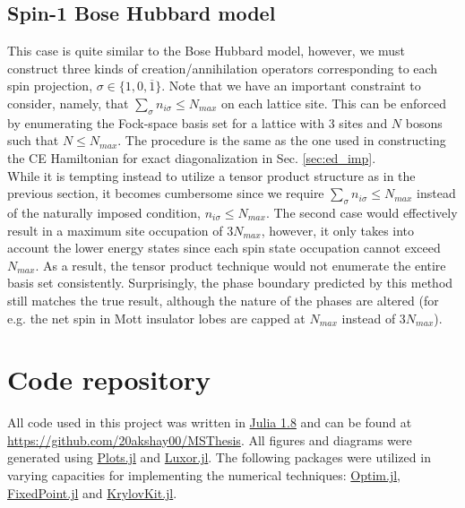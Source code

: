 \subsection{Spin-1 Bose Hubbard model}
This case is quite similar to the Bose Hubbard model, however, we must construct three kinds of creation/annihilation operators corresponding to each spin projection, $\sigma \in \{1, 0, \overline{1}\}$. Note that we have an important constraint to consider, namely, that $\sum_{\sigma} n_{i\sigma} \leq N_{max}$ on each lattice site. This can be enforced by enumerating the Fock-space basis set for a lattice with 3 sites and $N$ bosons such that $N \leq N_{max}$. The procedure is the same as the one used in constructing the CE Hamiltonian for exact diagonalization in Sec. \ref{sec:ed_imp}.
\vspace{0.5cm}\\
While it is tempting instead to utilize a tensor product structure as in the previous section, it becomes cumbersome since we require $\sum_{\sigma} n_{i\sigma} \leq N_{max}$ instead of the naturally imposed condition, $n_{i\sigma} \leq N_{max}$. The second case would effectively result in a maximum site occupation of $3N_{max}$, however, it only takes into account the lower energy states since each spin state occupation cannot exceed $N_{max}$. As a result, the tensor product technique would not enumerate the entire basis set consistently. Surprisingly, the phase boundary predicted by this method still matches the true result, although the nature of the phases are altered (for e.g. the net spin in Mott insulator lobes are capped at $N_{max}$ instead of $3N_{max}$).

\section{Code repository}

All code used in this project was written in \href{https://julialang.org/}{Julia 1.8}\cite{Julia-2017} and can be found at \url{https://github.com/20akshay00/MSThesis}. All figures and diagrams were generated using \href{https://github.com/JuliaPlots/Plots.jl}{Plots.jl}\cite{christ2022plotsjl} and \href{https://github.com/JuliaGraphics/Luxor.jl}{Luxor.jl}. The following packages were utilized in varying capacities for implementing the numerical techniques: \href{https://github.com/JuliaNLSolvers/Optim.jl}{Optim.jl}\cite{mogensen2018optim}, \href{https://github.com/francescoalemanno/FixedPoint.jl}{FixedPoint.jl} and \href{https://github.com/Jutho/KrylovKit.jl}{KrylovKit.jl}. 